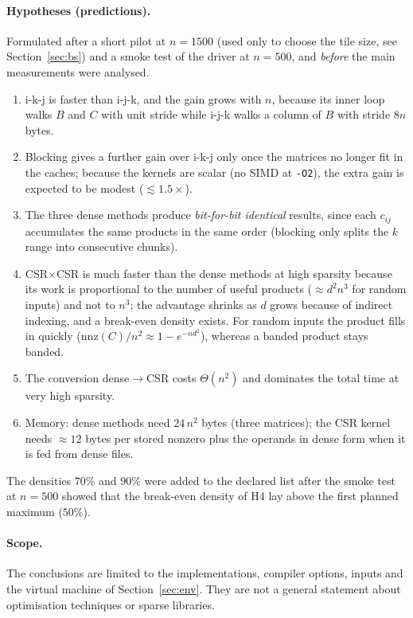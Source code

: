 \paragraph{Hypotheses (predictions).} Formulated after a short pilot at $n=1500$ (used only to choose the tile size, see
Section~\ref{sec:bs}) and a smoke test of the driver at $n=500$, and \emph{before} the main measurements were analysed.
\begin{enumerate}
  \item[H1] i-k-j is faster than i-j-k, and the gain grows with $n$, because its inner loop walks $B$ and $C$ with unit stride while i-j-k
        walks a column of $B$ with stride $8n$ bytes.
  \item[H2] Blocking gives a further gain over i-k-j only once the matrices no longer fit in the caches; because the kernels are scalar
        (no SIMD at \texttt{-O2}), the extra gain is expected to be modest ($\lesssim1.5\times$).
  \item[H3] The three dense methods produce \emph{bit-for-bit identical} results, since each $c_{ij}$ accumulates the same products in the
        same order (blocking only splits the $k$ range into consecutive chunks).
  \item[H4] CSR$\times$CSR is much faster than the dense methods at high sparsity because its work is proportional to the number of useful
        products ($\approx d^2n^3$ for random inputs) and not to $n^3$; the advantage shrinks as $d$ grows because of indirect indexing, and a
        break-even density exists. For random inputs the product fills in quickly ($\text{nnz}(C)/n^2\approx1-e^{-nd^2}$), whereas a banded
        product stays banded.
  \item[H5] The conversion dense$\to$CSR costs $\Theta(n^2)$ and dominates the total time at very high sparsity.
  \item[H6] Memory: dense methods need $24\,n^2$ bytes (three matrices); the CSR kernel needs $\approx12$ bytes per stored nonzero plus the
        operands in dense form when it is fed from dense files.
\end{enumerate}
The densities $70\%$ and $90\%$ were added to the declared list after the smoke test at $n=500$ showed that the break-even density
of H4 lay above the first planned maximum ($50\%$).

\paragraph{Scope.} The conclusions are limited to the implementations, compiler options, inputs and the virtual machine of
Section~\ref{sec:env}. They are not a general statement about optimisation techniques or sparse libraries.

